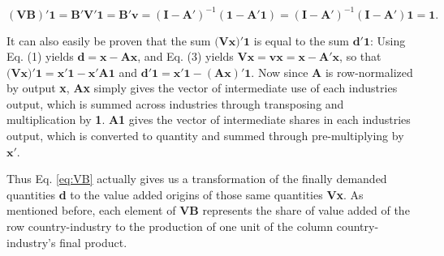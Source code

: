 \documentclass[a4paper]{article}
\begin{document}
\begin{equation} \label{eq:VBproof}
(\textbf{VB})'\textbf{1} = \textbf{B}'\textbf{V}'\textbf{1} =  \textbf{B}'\textbf{v}  = (\textbf{I}-\textbf{A}')^{-1}  (\textbf{1}-\textbf{A}'\textbf{1}) = (\textbf{I}-\textbf{A}')^{-1}  (\textbf{I}-\textbf{A}')\textbf{1} = \textbf{1}.
\end{equation}



It can also easily be proven that the sum $\textbf{(Vx)}'\textbf{1}$ is equal to the sum $\textbf{d}'\textbf{1}$: Using Eq. (1) yields $\textbf{d} = \textbf{x} - \textbf{Ax}$, and Eq. (3) yields $\textbf{Vx} = \textbf{vx} = \textbf{x} - \textbf{A}'\textbf{x}$, so that $\textbf{(Vx)}'\textbf{1} = \textbf{x}'\textbf{1} - \textbf{x}'\textbf{A}\textbf{1}$ and $\textbf{d}'\textbf{1} = \textbf{x}'\textbf{1} - (\textbf{A}\textbf{x})'\textbf{1}$. Now since \textbf{A} is row-normalized by output \textbf{x}, \textbf{Ax} simply gives the vector of intermediate use of each industries output, which is summed across industries through transposing and multiplication by \textbf{1}.  \textbf{A}\textbf{1} gives the vector of intermediate shares in each industries output, which is converted to quantity and summed through pre-multiplying by $\textbf{x}'$. \newline

Thus Eq. \ref{eq:VB} actually gives us a transformation of the finally demanded quantities \textbf{d} to the value added origins of those same quantities \textbf{Vx}. As mentioned before, each element of \textbf{VB} represents the share of value added of the row country-industry to the production of one unit of the column country-industry's final product.  \newline
\end{document}
